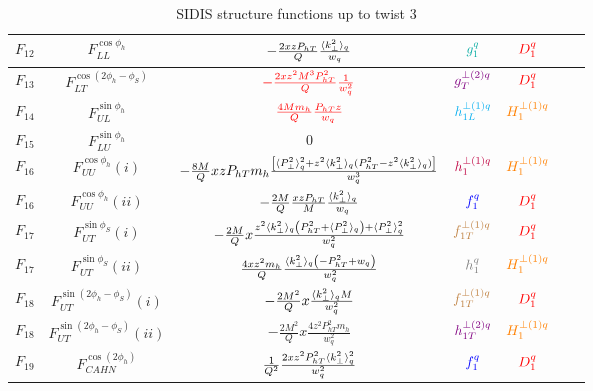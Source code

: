 \documentclass[floatfix,aps,prd,nofootinbib,superscriptaddress,preprint]{revtex4}
\newcommand\3[1]{\boldsymbol{#1}}
\newcommand{\Phperp}{P_{hT}}
\begin{document}
\begin{table}[h!]
\begin{tabular}{|c|c|c|c|c|c|c|}
$F_{12}$ & $F_{LL}^{\cos\phi_h}$               & $-\frac{2xz\Phperp}{Q}\frac{\avk}{w_q}$                                                     & $\ppdf$         & ${\color{red} D_1^{q}}$           \\\hline
$F_{13}$ & $F_{LT}^{\cos(2\phi_h -\phi_S)}$    & $\color{red} -\frac{2 x z^2 M^3 \Phperp^2}{Q}\frac{1}{w_q^2}$                                          & ${\color{violet} g^{\perp(2)q}_{T} }$          & ${\color{red} D_1^{q}}$           \\\hline
$F_{14}$ & $F_{UL}^{\sin\phi_h}$               & $\color{red} \frac{4 M m_h}{Q}  \frac{\Phperp z}{w_q}$                        & ${\color{cyan}h^{\perp (1) q}_{1L}}$          & ${\color{orange} H^{\perp(1)q}_{1} }$      \\\hline
$F_{15}$ & $F_{LU}^{\sin\phi_h}$               & $0$                                                                                         &                 & \\\hline
$F_{16}$ & $F_{UU}^{\cos\phi_h}(i)$            & $-\frac{8M}{Q} xz\Phperp m_h \frac{\left[\avp^2+z^2 \avk (\Phperp^2  -z^2\avk ) \right]}{w_q^3}$ & ${\color{purple} h^{\perp(1)q}_1 }$  & ${\color{orange} H^{\perp(1)q}_{1} }$      \\\hline
$F_{16}$ & $F_{UU}^{\cos\phi_h}(ii)$           & $-\frac{2M}{Q} \frac{xz\Phperp}{M} \frac{\avk}{w_q}$                                                           & ${\color{blue} f_1^q}$          & ${\color{red} D_1^{q}} $          \\\hline
$F_{17}$ & $F_{UT}^{\sin\phi_S}(i)$            & $-\frac{2M}{Q} x \frac{z^2\avk \left(\Phperp^2+\avp\right) + \avp^2}{w_q^2}$                & ${\color{brown} f^{\perp(1)q}_{1T}}$       & ${\color{red} D_1^{q}}$           \\\hline
$F_{17}$ & $F_{UT}^{\sin\phi_S}(ii)$           & $\frac{4 x z^2 m_h}{Q}\frac{\avk\left(-\Phperp^2+w_q\right)}{w_q^2} $                       & $\transversity$ & ${\color{orange} H^{\perp(1)q}_{1} }$      \\\hline
$F_{18}$ & $F_{UT}^{\sin(2\phi_h-\phi_S)}(i)$  & $-\frac{2M^2}{Q} x \frac{\langle k_{\perp}^2\rangle_q M}{w_q^2} $                                                   & ${\color{brown} f^{\perp(1)q}_{1T}}$       & ${\color{red} D_1^{q}}$           \\\hline
$F_{18}$ & $F_{UT}^{\sin(2\phi_h-\phi_S)}(ii)$ & $-\frac{2M^2}{Q} x \frac{4z^2 \Phperp^2 m_h}{w_q^2}$                                        & ${\color{violet} h^{\perp(2)q}_{1T} }$ & ${\color{orange} H^{\perp(1)q}_{1} }$      \\\hline
$F_{19}$ & $F_{CAHN}^{\cos(2\phi_h)}$          & $\frac{1}{Q^2} \frac{2 x z^2 \Phperp^2 \avk^2}{w_q^2}$                                      & ${\color{blue} f_1^q}$          & ${\color{red} D_1^{q}} $          \\\hline
\end{tabular}
\caption{SIDIS structure functions up to twist 3}
\label{t.chi2}
\end{table}
\end{document}

